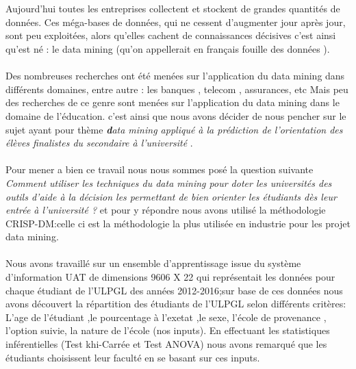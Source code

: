 \makeatletter
\renewenvironment{abstract}{%
	\if@twocolumn
	\section*{\abstractname}%
	\else %
	\begin{center}%
		{\bfseries\Large\textit {\abstractname}\vspace{\z@}}%
	\end{center}%
	\quotation
	\fi}
{\if@twocolumn\else\endquotation\fi}
\makeatother
{} 
\begin{abstract}
	\thispagestyle{plain} 
Aujourd'hui toutes les entreprises collectent et stockent de grandes quantités de données. Ces méga-bases de données, qui ne cessent d'augmenter jour après jour, sont peu exploitées, alors qu'elles cachent de connaissances décisives c'est ainsi qu'est né : le data mining   (qu'on appellerait en français fouille des données ).
\paragraph{}
Des nombreuses recherches ont été menées sur l'application du data mining dans différents domaines,  entre autre : les banques , telecom , assurances, etc
Mais peu des recherches de ce genre sont menées sur l'application du data mining dans le domaine de l'éducation. c'est ainsi que nous avons décider 
de nous pencher sur le sujet ayant pour thème \textit{ \textbf data mining appliqué à la prédiction de l'orientation des élèves finalistes du secondaire à l'université } .
\paragraph{}
Pour mener a bien ce travail nous nous sommes posé la question suivante \emph{Comment utiliser les techniques  du data mining pour doter les universités des outils d'aide à la décision les permettant de bien orienter les étudiants dès leur entrée à l'université ?  } et pour y répondre nous avons utilisé la méthodologie  \ac{CRISP-DM}:celle ci est la méthodologie la plus utilisée en industrie pour les projet data mining.
\paragraph{}
Nous avons travaillé sur un ensemble d'apprentissage issue du système d'information UAT de dimensions 9606 X 22 qui représentait les données pour chaque étudiant de l'ULPGL des années 2012-2016;sur base de ces données nous avons découvert la répartition des étudiants de l'ULPGL selon différents critères:  L'age de l'étudiant ,le pourcentage à l'exetat ,le sexe, l'école de provenance , l'option suivie, la nature de l'école  (nos inputs). 
En effectuant les statistiques inférentielles (Test khi-Carrée et Test ANOVA) nous avons remarqué que les étudiants choisissent leur faculté  en se basant sur ces inputs.

\end{abstract}
